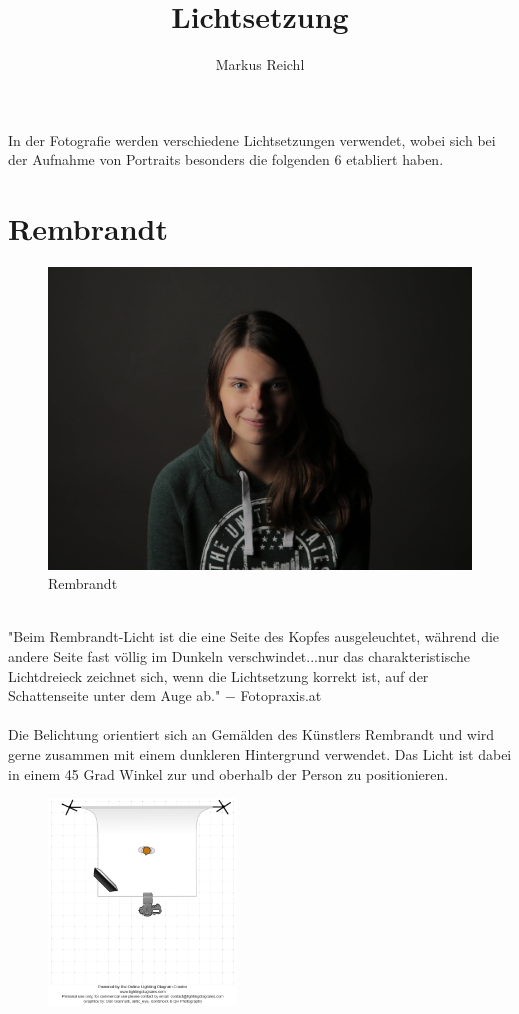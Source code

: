 \documentclass[landscape, notoc]{school}
\title{Lichtsetzung}
\author{Markus Reichl}
\begin{document}
\thispagestyle{fancy}

In der Fotografie werden verschiedene Lichtsetzungen verwendet, wobei sich bei der Aufnahme von Portraits besonders die folgenden 6 etabliert haben.

\section{Rembrandt}
\begin{minipage}[t]{.55\textwidth}
\begin{figure}[H]
	\centering
	\includegraphics[width=12cm]{1-rembrandt.jpg}
	\caption{Rembrandt}
\end{figure}
\end{minipage}
\begin{minipage}[t]{.45\textwidth}
~\\
"Beim Rembrandt-Licht ist die eine Seite des Kopfes ausgeleuchtet, während die andere Seite fast völlig im Dunkeln verschwindet...nur das charakteristische Lichtdreieck zeichnet sich, wenn die Lichtsetzung korrekt ist, auf der Schattenseite unter dem Auge ab."
$-$ Fotopraxis.at \cite{fp-rembrandt}
\\\\
Die Belichtung orientiert sich an Gemälden des Künstlers Rembrandt und wird gerne zusammen mit einem dunkleren Hintergrund verwendet. Das Licht ist dabei in einem 45 Grad Winkel zur und oberhalb der Person zu positionieren.
\begin{figure}[H]
	\centering
	\includegraphics[width=5cm]{1-rembrandt-diagram.png}
\end{figure}
\end{minipage}
\end{document}
